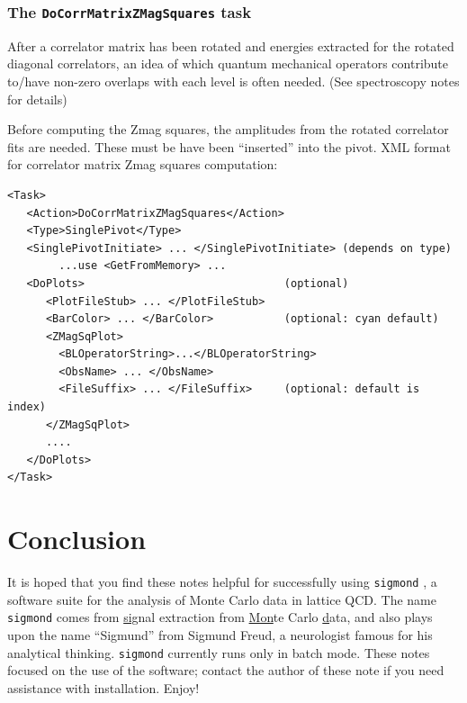 \documentclass[12pt]{article}
\newcommand{\sigmond}{\texttt{sigmond} }
\newcommand{\vb}{\texttt}
\begin{document}
\subsubsection{The \vb{DoCorrMatrixZMagSquares} task}
After a correlator matrix has been rotated and energies extracted for the rotated diagonal correlators,
an idea of which quantum mechanical operators contribute to/have non-zero overlaps with each level is
often needed. (See spectroscopy notes for details)

Before computing the Zmag squares, the amplitudes from the rotated correlator fits are needed.
These must be have been ``inserted'' into the pivot. XML format for correlator matrix Zmag squares computation:

\begin{verbatim}
<Task>
   <Action>DoCorrMatrixZMagSquares</Action>
   <Type>SinglePivot</Type>
   <SinglePivotInitiate> ... </SinglePivotInitiate> (depends on type)
        ...use <GetFromMemory> ...
   <DoPlots>                               (optional)
      <PlotFileStub> ... </PlotFileStub>
      <BarColor> ... </BarColor>           (optional: cyan default)
      <ZMagSqPlot>
        <BLOperatorString>...</BLOperatorString>
        <ObsName> ... </ObsName>
        <FileSuffix> ... </FileSuffix>     (optional: default is index)
      </ZMagSqPlot>
      ....
   </DoPlots>
</Task>
\end{verbatim}

\section{Conclusion}

It is hoped that you find these notes helpful for successfully using
\sigmond, a software suite for the analysis of Monte Carlo data in
lattice QCD.  The name \texttt{sigmond} comes from \underline{sig}nal
extraction from \underline{Mon}te Carlo \underline{d}ata, and also plays
upon the name ``Sigmund'' from Sigmund Freud, a neurologist famous for
his analytical thinking.
\sigmond currently runs only in batch mode.
These notes focused on the use of the software; contact the author
of these note if you need assistance with installation.
Enjoy!
\end{document}
